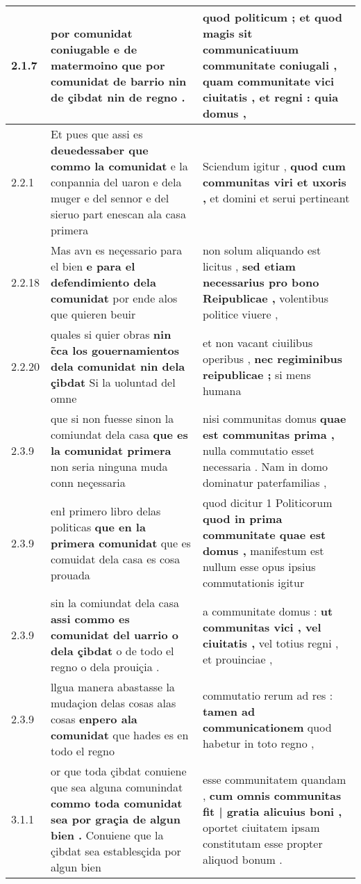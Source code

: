 \begin{tabular}{|p{1cm}|p{6.5cm}|p{6.5cm}|}
2.1.7 & por comunidat coniugable e de matermoino \textbf{ que por comunidat de barrio } nin de çibdat nin de regno . & quod politicum ; et quod magis sit communicatiuum communitate coniugali , \textbf{ quam communitate vici ciuitatis , et regni : } quia domus , \\\hline
2.2.1 & Et pues que assi es \textbf{ deuedessaber que commo la comunidat } e la conpannia del uaron e dela muger e del sennor e del sieruo part enescan ala casa primera & Sciendum igitur , \textbf{ quod cum communitas viri et uxoris , } et domini et serui pertineant \\\hline
2.2.18 & Mas avn es neçessario para el bien \textbf{ e para el defendimiento dela comunidat } por ende alos que quieren beuir & non solum aliquando est licitus , \textbf{ sed etiam necessarius pro bono Reipublicae , } volentibus politice viuere , \\\hline
2.2.20 & quales si quier obras \textbf{ nin c̃ca los gouernamientos dela comunidat nin dela çibdat } Si la uoluntad del omne & et non vacant ciuilibus operibus , \textbf{ nec regiminibus reipublicae ; } si mens humana \\\hline
2.3.9 & que si non fuesse sinon la comiundat dela casa \textbf{ que es la comunidat primera } non seria ninguna muda conn neçessaria & nisi communitas domus \textbf{ quae est communitas prima , } nulla commutatio esset necessaria . Nam in domo dominatur paterfamilias , \\\hline
2.3.9 & enł primero libro delas politicas \textbf{ que en la primera comunidat } que es comuidat dela casa es cosa prouada & quod dicitur 1 Politicorum \textbf{ quod in prima communitate quae est domus , } manifestum est nullum esse opus ipsius commutationis igitur \\\hline
2.3.9 & sin la comiundat dela casa \textbf{ assi commo es comunidat del uarrio o dela çibdat } o de todo el regno o dela prouiçia . & a communitate domus : \textbf{ ut communitas vici , vel ciuitatis , } vel totius regni , et prouinciae , \\\hline
2.3.9 & llgua manera abastasse la mudaçion delas cosas alas cosas \textbf{ enpero ala comunidat } que hades es en todo el regno & commutatio rerum ad res : \textbf{ tamen ad communicationem } quod habetur in toto regno , \\\hline
3.1.1 & or que toda çibdat conuiene que sea alguna comunindat \textbf{ commo toda comunidat sea por graçia de algun bien . } Conuiene que la çibdat sea establesçida por algun bien & esse communitatem quandam , \textbf{ cum omnis communitas fit | gratia alicuius boni , } oportet ciuitatem ipsam constitutam esse propter aliquod bonum . \\\hline

\end{tabular}
